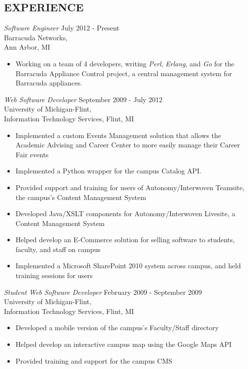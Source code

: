 \documentclass[line,margin]{res}
\begin{document}
\begin{resume}
\section{EXPERIENCE}
    {\sl Software Engineer }
            \hfill July 2012 - Present \\
                    Barracuda Networks, \\
                    Ann Arbor, MI
        \begin{itemize}
            \item Working on a team of 4 developers, writing {\sl Perl}, {\sl Erlang},
                  and {\sl Go} for the Barracuda Appliance Control project, a central
                  management system for Barracuda appliances.
        \end{itemize}

    {\sl Web Software Developer }
            \hfill September 2009 - July 2012 \\
                   University of Michigan-Flint, \\
                   Information Technology Services, Flint, MI
        \begin{itemize}
            \item Implemented a custom Events Management solution that
                  allows the Academic Advising and Career Center to
                  more easily manage their Career Fair events
			\item Implemented a Python wrapper for the campus Catalog API.
            \item Provided support and training for users of Autonomy/Interwoven
                  Teamsite, the campus's Content Management System
            \item Developed Java/XSLT components for Autonomy/Interwoven Livesite, a
                  Content Management System
            \item Helped develop an E-Commerce solution for selling software
                  to students, faculty, and staff on campus
            \item Implemented a Microsoft SharePoint 2010 system across
                  campus, and held training sessions for users \\
        \end{itemize}

    {\sl Student Web Software Developer }
            \hfill February 2009 - September 2009 \\
                   University of Michigan-Flint, \\
                   Information Technology Services, Flint, MI
        \begin{itemize}
            \item Developed a mobile version of the campus's Faculty/Staff
                  directory
            \item Helped develop an interactive campus map using the
                  Google Maps API
            \item Provided training and support for the campus CMS
        \end{itemize}


\end{resume}
\end{document}
